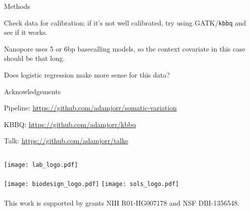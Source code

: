 \documentclass{beamer}
\begin{document}
\begin{frame}{Methods}
\item Check data for calibration; if it's not well calibrated, try using GATK/\texttt{kbbq} and see if it works.
\item Nanopore uses 5 or 6bp basecalling models, so the context covariate in this case should be that long.
\item Does logistic regression make more sense for this data?
\end{frame}


\begin{frame}{Acknowledgements}

Pipeline:  \url{https://github.com/adamjorr/somatic-variation}

KBBQ:  \url{https://github.com/adamjorr/kbbq}

Talk:  \url{https://github.com/adamjorr/talks}

\vfill

\begin{columns}
	\texttt{[image: lab\_logo.pdf]}
	\\~\\
	\texttt{[image: biodesign\_logo.pdf]}
	\texttt{[image: sols\_logo.pdf]}
	\\~\\
	This work is supported by grants NIH R01-HG007178 and NSF DBI-1356548.
\end{columns}

\end{frame}
\end{document}
